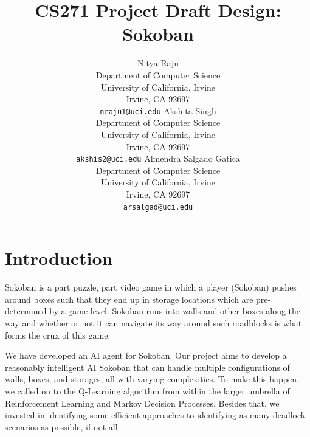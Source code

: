 \documentclass{article}
\title{CS271 Project Draft Design: Sokoban}
\author{
  Nitya Raju\\
  Department of Computer Science\\
  University of California, Irvine\\
  Irvine, CA 92697\\
  \texttt{nraju1@uci.edu} 
   \And
  Akshita Singh \\
  Department of Computer Science\\
  University of California, Irvine\\
  Irvine, CA 92697\\
  \texttt{akshis2@uci.edu} 
   \And
  Almendra Salgado Gatica \\
  Department of Computer Science\\
  University of California, Irvine\\
  Irvine, CA 92697\\
  \texttt{arsalgad@uci.edu} 
}
\begin{document}
\maketitle


\section{Introduction}

Sokoban is a part puzzle, part video game in which a player (Sokoban) pushes around boxes such that they end up in storage locations which are pre-determined by a game level. Sokoban runs into walls and other boxes along the way and whether or not it can navigate its way around such roadblocks is what forms the crux of this game. 

We have developed an AI agent for Sokoban. Our project aims to develop a reasonably intelligent AI Sokoban that can handle multiple configurations of walls, boxes, and storages, all with varying complexities. To make this happen, we called on to the Q-Learning algorithm from within the larger umbrella of Reinforcement Learning and Markov Decision Processes. Besides that, we invested in identifying some efficient approaches to identifying as many deadlock scenarios as possible, if not all. 



\end{document}
